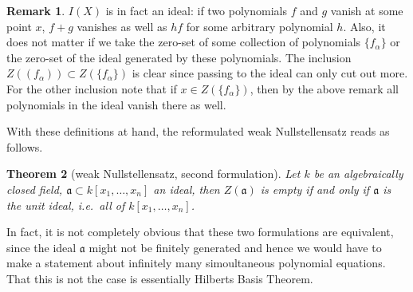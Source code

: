 \documentclass[11pt, a4paper, english, twoside]{article}
\theoremstyle{plain}
\newtheorem{theorem}{Theorem}[section]
\theoremstyle{definition}
\newtheorem{remark}[theorem]{Remark}
\begin{document}
\begin{remark}
    \label{zeroIdeal}
    $I(X)$ is in fact an ideal: if two polynomials $f$ and $g$ vanish at some point $x$, $f+g$ vanishes as well as $hf$ for some arbitrary polynomial $h$.
    Also, it does not matter if we take the zero-set of some collection of polynomials $\{f_\alpha\}$ or the zero-set of the ideal generated by
    these polynomials. The inclusion $Z((f_\alpha)) \subset Z(\{f_\alpha\})$ is clear since passing to the ideal can only cut out more.
    For the other inclusion note that if $x \in Z(\{f_\alpha\})$, then by the above remark all polynomials in the ideal vanish there as well.
\end{remark}

With these definitions at hand, the reformulated weak Nullstellensatz reads as follows.

\begin{theorem}[weak Nullstellensatz, second formulation]
    Let $k$ be an algebraically closed field, $\mathfrak{a} \subset k[x_1,\dots,x_n]$ an ideal, then $Z(\mathfrak{a})$ is empty if and only if 
    $\mathfrak{a}$ is the unit ideal, i.e.\ all of $k[x_1,\dots,x_n]$.
\end{theorem}

In fact, it is not completely obvious that these two formulations are equivalent, since the ideal $\mathfrak{a}$ might not be finitely generated
and hence we would have to make a statement about infinitely many simoultaneous polynomial equations. That this is not the case is essentially
Hilberts Basis Theorem.
\end{document}
